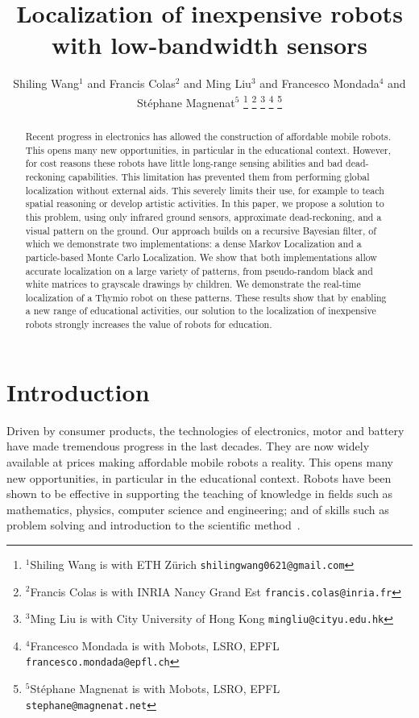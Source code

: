 \documentclass[letterpaper, 10pt, conference]{ieeeconf}
\title{\LARGE \bf
Localization of inexpensive robots with low-bandwidth sensors
}
\author{Shiling Wang$^{1}$ and Francis Colas$^{2}$ and Ming Liu$^{3}$ and Francesco Mondada$^{4}$ and Stéphane Magnenat$^{5}$%
\thanks{$^{1}$Shiling Wang is with ETH Zürich
        {\tt\small shilingwang0621@gmail.com}}%
\thanks{$^{2}$Francis Colas is with INRIA Nancy Grand Est
        {\tt\small francis.colas@inria.fr}}%
\thanks{$^{3}$Ming Liu is with City University of Hong Kong
        {\tt\small mingliu@cityu.edu.hk}}%
\thanks{$^{4}$Francesco Mondada is with Mobots, LSRO, EPFL
        {\tt\small francesco.mondada@epfl.ch}}%
\thanks{$^{5}$Stéphane Magnenat is with Mobots, LSRO, EPFL
        {\tt\small stephane@magnenat.net}}%
}
\begin{document}
\maketitle
\thispagestyle{empty}
\pagestyle{empty}

\begin{abstract}
Recent progress in electronics has allowed the construction of affordable mobile robots.
This opens many new opportunities, in particular in the educational context.
However, for cost reasons these robots have little long-range sensing abilities and bad dead-reckoning capabilities.
This limitation has prevented them from performing global localization without external aids.
This severely limits their use, for example to teach spatial reasoning or develop artistic activities.
In this paper, we propose a solution to this problem, using only infrared ground sensors, approximate dead-reckoning, and a visual pattern on the ground.
Our approach builds on a recursive Bayesian filter, of which we demonstrate two implementations: a dense Markov Localization and a particle-based Monte Carlo Localization.
We show that both implementations allow accurate localization on a large variety of patterns, from pseudo-random black and white matrices to grayscale drawings by children.
We demonstrate the real-time localization of a Thymio robot on these patterns.
These results show that by enabling a new range of educational activities, our solution to the localization of inexpensive robots strongly increases the value of robots for education.

\end{abstract}

\section{Introduction}

Driven by consumer products, the technologies of electronics, motor and battery have made tremendous progress in the last decades.
They are now widely available at prices making affordable mobile robots a reality.
This opens many new opportunities, in particular in the educational context.
Robots have been shown to be effective in supporting the teaching of knowledge in fields such as mathematics, physics, computer science and engineering; and of skills such as problem solving and introduction to the scientific method~\cite{benitti2012explorin, karim2015review}.
\end{document}
